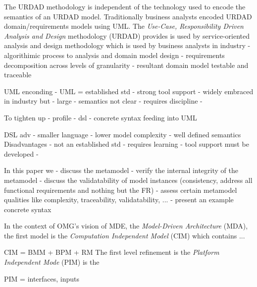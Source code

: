 The URDAD methodology is independent of the technology used to encode the semantics of an URDAD model. Traditionally business analysts encoded URDAD domain/requirements models using UML. 
The {\em Use-Case, Responsibility Driven Analysis and Design} methodology (URDAD) provides is used by 
service-oriented analysis and design methodology which is used by business analysts in industry
 - algorithimic process to analysis and domain model design
 - requirements decomposition across levels of granularity
 - resultant domain model testable and traceable

 



UML enconding
  - UML = established std
  - strong tool support
  - widely embraced in industry
but
  - large
  - semantics not clear
  - requires discipline
  - 

To tighten up
 - profile
 - dsl
 - concrete syntax feeding into UML 

DSL adv
  - smaller language
  - lower model complexity
  - well defined semantics
Disadvantages
  - not an established std
  - requires learning
  - tool support must be developed
  - 

In this paper we
  - discuss the metamodel
  - verify the internal integrity of the metamodel
  - discuss the validatability of model instances (consistency, address all functional requirements and nothing but the FR)
  - assess certain metamodel qualities like complexity, traceability, validatability, ...
  - present an example concrete syntax


In the context of OMG's vision of MDE, the {\em Model-Driven Architecture} (MDA), the first model is the 
{\em Computation Independent Model} (CIM) which contains ... 

CIM = BMM + BPM + RM
The first level refinement is the {\em Platform Independent Mode} (PIM)
is the

PIM = interfaces, inputs

